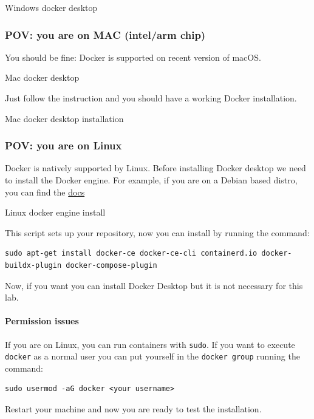 \documentclass[11pt,a4paper]{article}
\begin{document}
Windows docker desktop

\subsubsection{POV: you are on MAC (intel/arm
chip)}\label{pov-you-are-on-mac-intelarm-chip}

You should be fine: Docker is supported on recent version of macOS.

Mac docker desktop

Just follow the instruction and you should have a working Docker
installation.

Mac docker desktop installation

\subsubsection{POV: you are on Linux}\label{pov-you-are-on-linux}

Docker is natively supported by Linux. Before installing Docker desktop
we need to install the Docker engine. For example, if you are on a
Debian based distro, you can find the
\href{https://docs.docker.com/engine/install/ubuntu/\#install-using-the-repository}{docs}

Linux docker engine install

This script sets up your repository, now you can install by running the
command:

\begin{verbatim}
sudo apt-get install docker-ce docker-ce-cli containerd.io docker-buildx-plugin docker-compose-plugin
\end{verbatim}

Now, if you want you can install Docker Desktop but it is not necessary
for this lab.

\paragraph{Permission issues}\label{permission-issues}

If you are on Linux, you can run containers with \texttt{sudo}. If you
want to execute \texttt{docker} as a normal user you can put yourself in
the \texttt{docker\ group} running the command:

\begin{verbatim}
sudo usermod -aG docker <your username>
\end{verbatim}

Restart your machine and now you are ready to test the installation.
\end{document}

